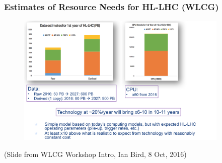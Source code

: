 \begin{frame}
\frametitle{Estimates of Resource Needs for HL-LHC (WLCG)}

\begin{figure}[htbp]
\begin{center}
\includegraphics[width=0.9\textwidth]{images/20161008-wlcg-intro-ian-bird-slide-10.png}
\end{center}
\end{figure}

\begin{center}
\small{(Slide from WLCG Workshop Intro, Ian Bird, 8 Oct, 2016)}
\end{center}

\end{frame}


